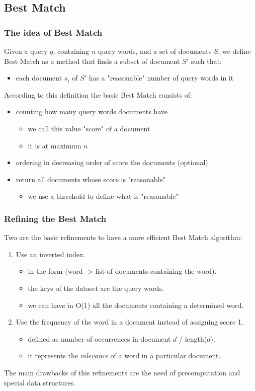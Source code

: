\documentclass{beamer}
\begin{document}
\subsection{Best Match}
\begin{frame}
\frametitle{The idea of Best Match}
Given a query $q$, containing $n$ query words, and a set of documents $S$, we define Best Match as a method that finds a subset of document $S'$ such that:
\begin{itemize}
\item each document $s_i$ of $S'$ has a "reasonable" number of query words in it
\end{itemize}
\medskip
According to this definition the basic Best Match consists of:
\begin{itemize}
\item counting how many query words documents have
\begin{itemize}
\item we call this value "score" of a document
\item it is at maximum $n$
\end{itemize}
\item ordering in decreasing order of score the documents (optional)
\item return all documents whose score is "reasonable"
\begin{itemize}
\item we use a threshold to define what is "reasonable"
\end{itemize}
\end{itemize}
\end{frame}

\begin{frame}
\frametitle{Refining the Best Match}
Two are the basic refinements to have a more efficient Best Match algorithm:
\begin{enumerate}
\item Use an inverted index.
\begin{itemize}
\item in the form (word -> list of documents containing the word).
\item the keys of the dataset are the query words.
\item we can have in O(1) all the documents containing a determined word.
\end{itemize}
\item Use the frequency of the word in a document instead of assigning score 1. 
\begin{itemize}
\item defined as number of occurrences in document $d$ / length($d$).
\item it represents the \emph{relevance} of a word in a particular document.
\end{itemize}	
\end{enumerate}
The main drawbacks of this refinements are the need of precomputation and special data structures.
\end{frame}
\end{document}
